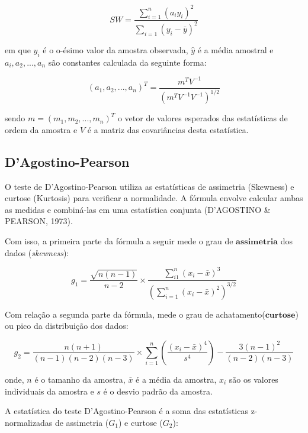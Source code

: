 \documentclass[a4paper,11pt]{article} %
\begin{document}
\begin{equation}
    SW = \frac{\sum_{i=1}^{n} (a_{i}y_{i})^{2}}{\sum_{i=1}  (y_{i} - \bar{y})^{2}}
\end{equation}

em que $y_{i}$ é o o-ésimo valor da amostra observada, $\hat{y}$ é a média amostral e $a_{i},a_{2},...,a_{n}$ são constantes calculada da seguinte forma:

\begin{equation}
    (a_{1},a_{2},...,a_{n})^{T} = \frac{m^{T}V^{-1}}{(m^{T}V^{-1}V^{-1} )^{1/2}}
\end{equation}

sendo $m=(m_{1},m_{2},...,m_{n})^{T}$ o vetor de valores esperados das estatísticas de ordem da amostra e $V$ é a matriz das covariâncias desta estatística.\vskip0.3cm

\subsection{D’Agostino-Pearson}

O teste de D'Agostino-Pearson utiliza as estatísticas de assimetria (Skewness) e curtose (Kurtosis) para verificar a normalidade. A fórmula envolve calcular ambas as medidas e combiná-las em uma estatística conjunta (D'AGOSTINO \& PEARSON, 1973).\vskip0.3cm



Com isso, a primeira parte da fórmula a seguir mede o grau de $\textbf{assimetria}$ dos dados (\textit{skewness}):

\begin{equation}
g_{1} = \frac{\sqrt{n(n-1)}}{n-2} \times \frac{\sum_{i1}^{n} (x_{i}-\bar{x})^{3}}{\left( \sum_{i=1}^{n} (x_{i}-\bar{x})^{2}\right)^{3/2}}
\end{equation}

Com relação a segunda parte da fórmula, mede o grau de achatamento($\textbf{curtose}$) ou pico da distribuição dos dados:

\begin{equation}
g_{2} = \frac{n(n+1)}{(n-1)(n-2)(n-3)} \times \sum_{i=1}^{n} \left(  \frac{(x_{i}-\bar{x})^{4}}{s^{4}} \right) - \frac{3(n-1)^{2}}{(n-2)(n-3)}
\end{equation}

\newpage
onde, $n$ é o tamanho da amostra, $\bar{x}$ é a média da amostra, $x_{i}$ são os valores individuais da amostra e $s$ é o desvio padrão da amostra.\vskip0.3cm

A estatística do teste  D'Agostino-Pearson é a soma das estatísticas z-normalizadas de assimetria ($G_{1}$) e curtose ($G_{2}$):\vskip0.3cm
\end{document}
